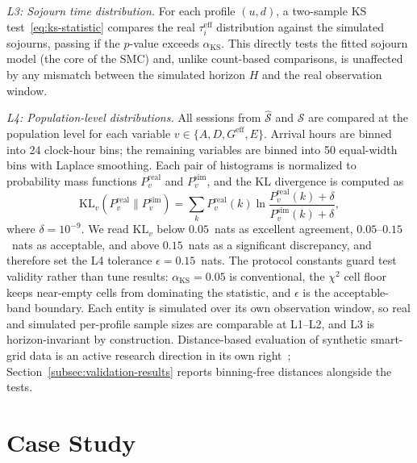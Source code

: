 \documentclass[journal]{IEEEtran}
\begin{document}
\emph{L3: Sojourn time distribution.} For each profile $(u, d)$, a two-sample KS test~\eqref{eq:ks-statistic} compares the real $\tau_i^{\mathrm{eff}}$ distribution against the simulated sojourns, passing if the $p$-value exceeds $\alpha_{\mathrm{KS}}$. This directly tests the fitted sojourn model (the core of the SMC) and, unlike count-based comparisons, is unaffected by any mismatch between the simulated horizon $H$ and the real observation window.

\emph{L4: Population-level distributions.} All sessions from $\hat{\mathcal{S}}$ and $\mathcal{S}$ are compared at the population level for each variable $v \in \{A, D, G^{\mathrm{eff}}, E\}$. Arrival hours are binned into 24 clock-hour bins; the remaining variables are binned into 50 equal-width bins with Laplace smoothing. Each pair of histograms is normalized to probability mass functions $P_v^{\mathrm{real}}$ and $P_v^{\mathrm{sim}}$, and the KL divergence is computed as
\begin{equation}
    \mathrm{KL}_v(P_v^{\mathrm{real}} \| P_v^{\mathrm{sim}}) =
    \sum_{k} P_v^{\mathrm{real}}(k)
    \ln \frac{P_v^{\mathrm{real}}(k) + \delta}
             {P_v^{\mathrm{sim}}(k) + \delta},
    \label{eq:kl-l4}
\end{equation}
where $\delta = 10^{-9}$. We read $\mathrm{KL}_v$ below $0.05$~nats as excellent agreement, $0.05$--$0.15$~nats as acceptable, and above $0.15$~nats as a significant discrepancy, and therefore set the L4 tolerance $\epsilon = 0.15$~nats. The protocol constants guard test validity rather than tune results: $\alpha_{\mathrm{KS}} = 0.05$ is conventional, the $\chi^2$ cell floor keeps near-empty cells from dominating the statistic, and $\epsilon$ is the acceptable-band boundary. Each entity is simulated over its own observation window, so real and simulated per-profile sample sizes are comparable at L1--L2, and L3 is horizon-invariant by construction. Distance-based evaluation of synthetic smart-grid data is an active research direction in its own right~\cite{cai2026frechet}; Section~\ref{subsec:validation-results} reports binning-free distances alongside the tests.



\section{Case Study}
\label{sec:case-study}
\end{document}
